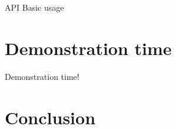\documentclass[aspectratio=169]{beamer}
\theoremstyle{definition}
\begin{document}
\begin{frame}{API Basic usage}
    
\end{frame}

\section{Demonstration time}
\begin{frame}
    \begin{center}
        \huge Demonstration time!
    \end{center}
\end{frame}



\section{Conclusion}
\begin{frame}[allowframebreaks]
    \nocite{*}
    \printbibliography
\end{frame}
\end{document}
